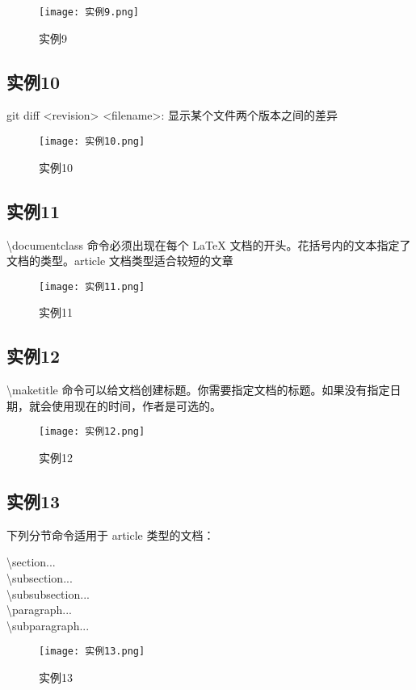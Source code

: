 \documentclass[a4paper, 12pt]{article}
\begin{document}
\begin{figure}[h!]
  \centering
  \texttt{[image: 实例9.png]}
  \caption{实例9}
\end{figure}

\subsection{实例10}
git diff <revision> <filename>: 显示某个文件两个版本之间的差异

\begin{figure}[h!]
  \centering
  \texttt{[image: 实例10.png]}
  \caption{实例10}
\end{figure}

\subsection{实例11}
\textbackslash documentclass 命令必须出现在每个 LaTeX 文档的开头。花括号内的文本指定了文档的类型。article 文档类型适合较短的文章

\begin{figure}[h!]
  \centering
  \texttt{[image: 实例11.png]}
  \caption{实例11}
\end{figure}

\subsection{实例12}
\textbackslash maketitle 命令可以给文档创建标题。你需要指定文档的标题。如果没有指定日期，就会使用现在的时间，作者是可选的。

\begin{figure}[h!]
  \centering
  \texttt{[image: 实例12.png]}
  \caption{实例12}
\end{figure}

\subsection{实例13}
下列分节命令适用于 article 类型的文档：

\textbackslash section{...}\\
\textbackslash subsection{...}\\
\textbackslash subsubsection{...}\\
\textbackslash paragraph{...}\\
\textbackslash subparagraph{...}

\begin{figure}[h!]
  \centering
  \texttt{[image: 实例13.png]}
  \caption{实例13}
\end{figure}
\end{document}
